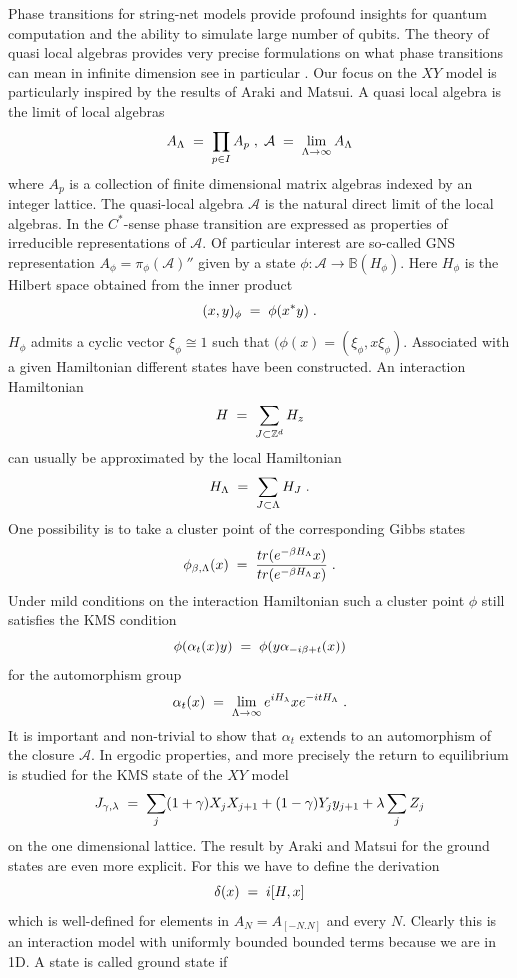 \documentclass[12pt, a4-paper]{amsart}
\numberwithin{equation}{section}
\newcommand{\lel}{\pl = \pl}
\newcommand{\zz}{{\mathbb Z}}
\newcommand{\pl}{\hspace{.1cm}}
\newcommand{\al}{\alpha}
\newcommand{\La}{\Lambda}
\newcommand{\la}{\lambda}
\newcommand{\A}{{\mathcal A}}
\begin{document}
Phase transitions for string-net models provide profound insights for quantum computation and the ability to simulate large number of qubits. The theory of quasi local algebras provides very precise formulations on what phase transitions can mean in infinite dimension see in particular \cite{ArEw,EvLew}. Our focus on the $XY$ model is particularly inspired by the results of Araki and Matsui. A quasi local algebra is the limit of local algebras
 \[ A_{\La} \lel \prod_{p\in I} A_p \pl ,\pl \mathcal{A} \lel \lim_{\La\to \infty} A_{\La} \]
where $A_p$ is a collection of finite dimensional matrix algebras indexed by an integer lattice. The quasi-local algebra $\A$ is the natural direct limit of the local algebras. In the $C^*$-sense phase transition are expressed as properties of irreducible representations of $\mathcal{A}$. Of particular interest are so-called GNS representation $A_{\phi}=\pi_{\phi}(\mathcal{A})''$ given by a state $\phi:\mathcal{A}\to \mathbb{B}(H_{\phi})$. Here $H_{\phi}$ is the Hilbert space obtained from the inner product
 \[ (x,y)_{\phi} \lel \phi(x^*y) \pl .\]
$H_{\phi}$ admits a cyclic vector $\xi_{\phi}\cong 1$ such that $(\phi(x)=(\xi_{\phi},x\xi_{\phi})$. Associated with a given Hamiltonian different states have been constructed. 
An interaction Hamiltonian 
 \[ H \lel \sum_{J\subset \zz^d} H_z  \]
can usually be approximated by the local Hamiltonian   
 \[ H_{\La} \lel \sum_{J\subset \La} H_{J} \pl.  \]
One possibility is to take a cluster point of the corresponding Gibbs states
 \[ \phi_{\beta,\La}(x) \lel \frac{tr(e^{-\beta H_{\La}}x)}{tr(e^{-\beta H_{\La}}x)} \pl. \] 
Under mild conditions \cite{BR1,BR2} on the interaction Hamiltonian such a cluster point $\phi$ still satisfies the KMS condition 
\[ \phi(\al_t(x)y) \lel \phi(y\al_{-i\beta+t}(x)) \]
for the automorphism group 
 \[ \al_t(x) \lel \lim_{\La \to \infty}  e^{iH_{\la}}xe^{-itH_{\La}} \pl . \]
It is important and non-trivial to show that $\al_t$ extends to an automorphism of the closure $\mathcal{A}$.   
In \cite{ArakiB} ergodic properties, and more precisely the return to equilibrium is studied for the KMS state of the $XY$ model 
 \[ J_{\gamma,\la} \lel \sum_{j} (1+\gamma)X_{j}X_{j+1}+(1-\gamma)Y_jy_{j+1}+ \la \sum_j Z_j\]
on the one dimensional lattice. The result by Araki and Matsui \cite{AM} for the ground states are even more explicit. For this we have to define the derivation 
 \[ \delta(x) \lel i[H,x] \]
which is well-defined for elements in $A_N=A_{[-N.N]}$ and every $N$. Clearly this is an interaction model with uniformly bounded bounded terms because we are in 1D. A state is called ground state if
\end{document}
